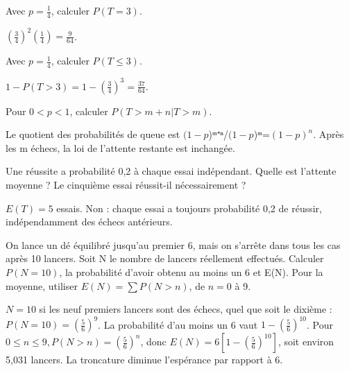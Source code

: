 \documentclass[11pt]{article}
\begin{document}
Avec \(p=\frac{1}{4}\), calculer \(P(T=3)\).\par
\((\frac{3}{4})^{2}(\frac{1}{4})=\frac{9}{64}\).\par
{}
Avec \(p=\frac{1}{4}\), calculer \(P(T\leq 3)\).\par
\(1-P(T>3)=1-(\frac{3}{4})^{3}=\frac{37}{64}\).\par
{}
Pour \(0<p<1\), calculer \(P(T>m+n|T>m)\).\par
Le quotient des probabilités de queue est \((1-p\))ᵐ⁺ⁿ/\((1-p\))ᵐ=\((1-p)^{n}\). Après les m échecs, la loi de l’attente restante est inchangée.\par
{}
Une réussite a probabilité 0,2 à chaque essai indépendant. Quelle est l’attente moyenne ? Le cinquième essai réussit-il nécessairement ?\par
\(E(T)=5\) essais. Non : chaque essai a toujours probabilité 0,2 de réussir, indépendamment des échecs antérieurs.\par
{}
On lance un dé équilibré jusqu’au premier 6, mais on s’arrête dans tous les cas après 10 lancers. Soit N le nombre de lancers réellement effectués. Calculer \(P(N=10)\), la probabilité d’avoir obtenu au moins un 6 et E(N). Pour la moyenne, utiliser \(E(N)=\sum  P(N>n)\), de \(n=0\) à 9.\par
\(N=10\) si les neuf premiers lancers sont des échecs, quel que soit le dixième : \(P(N=10)=(\frac{5}{6})^{9}\). La probabilité d’au moins un 6 vaut \(1-(\frac{5}{6})^{10}\). Pour \(0\leq n\leq 9, P(N>n)=(\frac{5}{6})^{n}\), donc \(E(N)=6[1-(\frac{5}{6})^{10}]\), soit environ 5,031 lancers. La troncature diminue l’espérance par rapport à 6.\par
\end{document}
